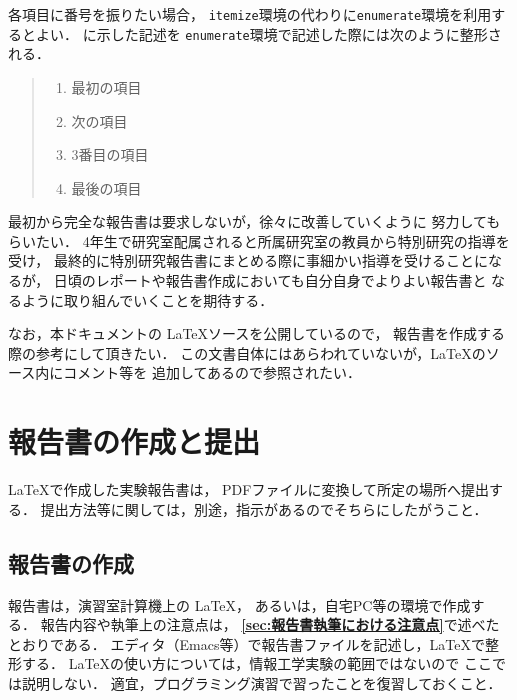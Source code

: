 \documentclass{jarticle}[11pt]
\newcommand{\figref}[1]{\makebox{図~\ref{#1}}}
\begin{document}
    各項目に番号を振りたい場合，
    \verb|itemize|環境の代わりに\verb|enumerate|環境を利用するとよい．
    \figref{fig:verbatim環境による列挙の記述例}に示した記述を
    \verb|enumerate|環境で記述した際には次のように整形される．
    \begin{quote}
    \begin{enumerate}
      \item 最初の項目
      \item 次の項目
      \item 3番目の項目
      \item 最後の項目
    \end{enumerate}
    \end{quote}
     
    最初から完全な報告書は要求しないが，徐々に改善していくように
    努力してもらいたい．
    4年生で研究室配属されると所属研究室の教員から特別研究の指導を受け，
    最終的に特別研究報告書にまとめる際に事細かい指導を受けることになるが，
    日頃のレポートや報告書作成においても自分自身でよりよい報告書と
    なるように取り組んでいくことを期待する．
     
    なお，本ドキュメントの \LaTeX ソースを公開しているので，
    報告書を作成する際の参考にして頂きたい．
    この文書自体にはあらわれていないが，\LaTeX のソース内にコメント等を
    追加してあるので参照されたい．
     
     
    \section{報告書の作成と提出}
    \label{sec:報告書の作成と提出}
    \LaTeX で作成した実験報告書は，
    PDFファイルに変換して所定の場所へ提出する．
    提出方法等に関しては，別途，指示があるのでそちらにしたがうこと．
     
    \subsection{報告書の作成}
    報告書は，演習室計算機上の \LaTeX，
    あるいは，自宅PC等の環境で作成する．
    報告内容や執筆上の注意点は，
    {\bf \ref{sec:報告書執筆における注意点}}で述べたとおりである．
    エディタ（Emacs等）で報告書ファイルを記述し，\LaTeX で整形する．
    \LaTeX の使い方については，情報工学実験の範囲ではないので
    ここでは説明しない．
    適宜，プログラミング演習で習ったことを復習しておくこと．
     
\end{document}
